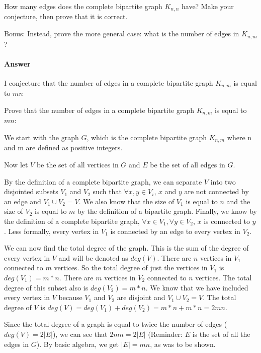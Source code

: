 \documentclass{article}
\begin{document}
\collab{\todo{}} 

How many edges does the complete bipartite graph $K_{n,n}$ have?  Make your
conjecture, then prove that it is correct.

Bonus: Instead, prove the more general case:
what is the number of edges in $K_{n,m}$?

\paragraph{Answer}

I conjecture that the number of edges in a complete bipartite graph $K_{n,m}$ is equal to $mn$

Prove that the number of edges in a complete bipartite graph $K_{n,m}$ is equal to $mn$:

We start with the graph $G$, which is the complete bipartite graph $K_{n,m}$ where n and m are defined as positive integers.

Now let $V$ be the set of all vertices in $G$ and $E$ be the set of all edges in $G$.

By the definition of a complete bipartite graph, we can separate $V$ into two disjointed subsets $V_1$ and $V_2$ such that $\forall x, y \in V_i$, $x$ and $y$ are not connected by an edge and $V_1 \cup V_2 = V$. We also know that the size of $V_1$ is equal to $n$ and the size of $V_2$ is equal to $m$ by the definition of a bipartite graph. Finally, we know by the definition of a complete bipartite graph, $\forall x \in V_1, \forall y \in V_2$, $x$ is connected to $y$. Less formally, every vertex in $V_1$ is connected by an edge to every vertex in $V_2$.

We can now find the total degree of the graph. This is the sum of the degree of every vertex in $V$ and will be denoted as $deg(V)$. There are $n$ vertices in $V_1$ connected to $m$ vertices. So the total degree of just the vertices in $V_1$ is $deg(V_1) = m*n$. There are $m$ vertices in $V_2$ connected to $n$ vertices. The total degree of this subset also is $deg(V_2) = m*n$. We know that we have included every vertex in $V$ because $V_1$ and $V_2$ are disjoint and $V_1 \cup V_2 = V$. The total degree of $V$ is $deg(V) = deg(V_1) + deg(V_2) = m*n + m*n = 2mn$.

 Since the total degree of a graph is equal to twice the number of edges ($deg(V) = 2 |E|$), we can see that $2mn = 2|E|$ (Reminder: $E$ is the set of all the edges in $G$). By basic algebra, we get $|E| = mn$, as was to be shown.
\end{document}
